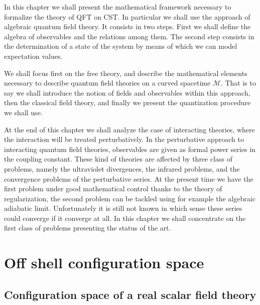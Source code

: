\documentclass[11pt]{book}
\newcommand{\Mcal}{\mathcal{M}}
\theoremstyle{break}
\begin{document}
In this chapter we shall present the mathematical framework necessary to formalize the theory of QFT on CST. In particular we shall use the approach of algebraic quantum field theory. It consists in two steps. First we shall define the algebra of observables and the relations among them. The second step consists in the determination of a state of the system by means of which we can model expectation values.


We shall focus first on the free theory, and describe the mathematical elements necessary to describe quantum field theories on a curved spacetime $\Mcal$. That is to say we shall introduce the notion of fields and observables within this approach, then the classical field theory, and finally we present the quantization procedure we shall use.


At the end of this chapter we shall analyze the case of interacting theories, where the interaction will be treated perturbatively. In the perturbative approach to interacting quantum field theories, observables are given as formal power series in the coupling constant. These kind of theories are affected by three class of problems, namely the ultraviolet divergences, the infrared problems, and the convergence problems of the perturbative series. At the present time we have the first problem under good mathematical control thanks to the theory of regularization, the second problem can be tackled using for example the algebraic adiabatic limit. Unfortunately it is still not known in which sense these series could converge if it converge at all. In this chapter we shall concentrate on the first class of problems presenting the status of the art.


\section{Off shell configuration space}
\label{p:OFF_SHELL_CONFIG_SPACE}


\subsection{Configuration space of a real scalar field theory}
\label{p:DEF_CONFIG_SPACE}
\end{document}
